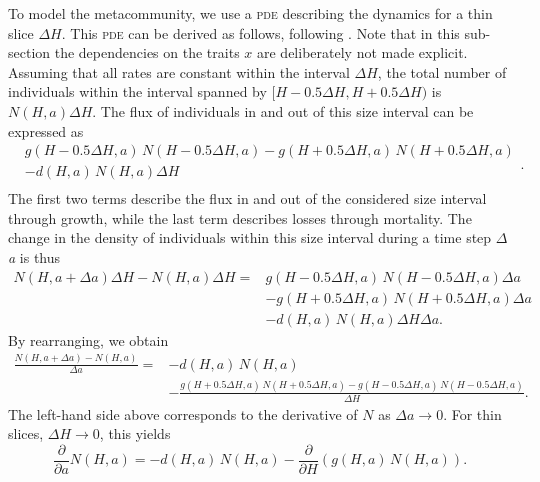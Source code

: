 \documentclass[10pt,twoside]{article}
\begin{document}
To model the metacommunity, we use a \textsc{pde} describing the dynamics for a thin
slice \(\Delta H\). This \textsc{pde} can be derived as follows, following
\citet{Deroos-1997}. Note that in this sub-section the dependencies on the traits $x$ are deliberately not made explicit. Assuming that all rates are constant within the
interval \(\Delta H\), the total number of individuals within the
interval spanned by \([H - 0.5\Delta H, H + 0.5\Delta H)\) is
\(N(H, a)\Delta H\). The flux of individuals in and out of this size
interval can be expressed as
\begin{equation}\begin{array}{ll} &g(H - 0.5 \Delta H, a) \, N(H - 0.5 \Delta H, a) - g(H + 0.5 \Delta H, a) \, N(H + 0.5 \Delta H, a) \\ & - d (H, a) \, N(H, a)\Delta H\\ \end{array}.
\end{equation}
The first two terms describe the flux in and out of the considered size interval
through growth, while the last term describes losses through mortality.
The change in the density of individuals within this size interval during a time
step \textit{$\Delta $a} is thus
\begin{equation}
\begin{array}{ll} N(H, a + \Delta a)\Delta H - N(H, a)\Delta H = &g(H - 0.5 \Delta H, a) \, N(H - 0.5 \Delta H, a)\Delta a \\ & - g(H + 0.5 \Delta H, a) \, N(H + 0.5 \Delta H, a)\Delta a\\& - d (H, a) \, N(H, a)\Delta H\Delta a.
\end{array}
\end{equation}
By rearranging, we obtain
\begin{equation}
\begin{array}{ll}
\frac{N(H, a + \Delta a) - N(H, a)}{\Delta a} = & - d (H, a) \, N(H, a) \\
& - \frac{g(H + 0.5 \Delta H, a) \, N(H + 0.5 \Delta H, a) - g(H - 0.5 \Delta H, a) \, N(H - 0.5 \Delta H, a)}{\Delta H}.
\end{array}
\end{equation}
The left-hand side above corresponds to the derivative of \(N\) as \(\Delta a\to 0\).
For thin slices, \(\Delta H \to 0\), this yields
\begin{equation} \label{eq:PDE-app}
\frac{\partial}{\partial a} N(H, a) = - d (H, a) \, N(H, a) - \frac{\partial}{\partial H} (g(H, a) \, N(H, a)).
\end{equation}
\end{document}
